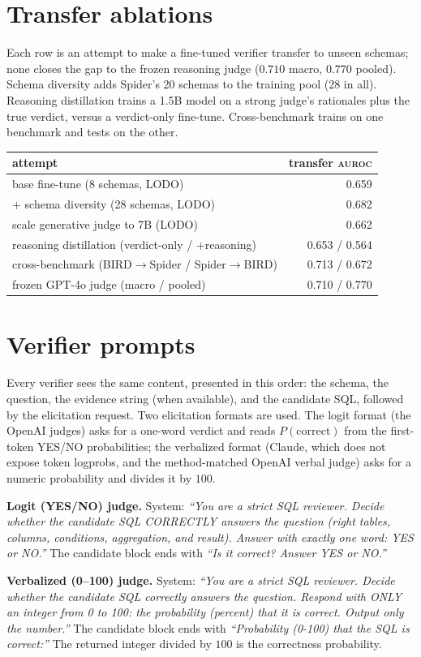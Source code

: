 \documentclass[11pt]{article}
\newcommand{\auroc}{\textsc{auroc}}
\begin{document}
\section{Transfer ablations}
\label{app:transfer}
Each row is an attempt to make a fine-tuned verifier transfer to unseen schemas; none closes the gap
to the frozen reasoning judge ($0.710$ macro, $0.770$ pooled). Schema diversity adds Spider's 20
schemas to the training pool (28 in all). Reasoning distillation trains a 1.5B model on a strong
judge's rationales plus the true verdict, versus a verdict-only fine-tune. Cross-benchmark trains on
one benchmark and tests on the other.
\begin{table}[h]\centering
\begin{tabular}{lr}
\toprule
attempt & transfer \auroc{} \\
\midrule
base fine-tune (8 schemas, LODO) & 0.659 \\
+ schema diversity (28 schemas, LODO) & 0.682 \\
scale generative judge to 7B (LODO) & 0.662 \\
reasoning distillation (verdict-only / +reasoning) & 0.653 / 0.564 \\
cross-benchmark (BIRD$\rightarrow$Spider / Spider$\rightarrow$BIRD) & 0.713 / 0.672 \\
\midrule
frozen GPT-4o judge (macro / pooled) & 0.710 / 0.770 \\
\bottomrule
\end{tabular}
\end{table}

\section{Verifier prompts}
\label{app:prompts}
Every verifier sees the same content, presented in this order: the schema, the question, the evidence
string (when available), and the candidate SQL, followed by the elicitation request. Two elicitation
formats are used. The logit format (the OpenAI judges) asks for a one-word verdict and reads
$P(\text{correct})$ from the first-token YES/NO probabilities; the verbalized format (Claude, which
does not expose token logprobs, and the method-matched OpenAI verbal judge) asks for a numeric
probability and divides it by $100$.

\noindent\textbf{Logit (YES/NO) judge.} System: \textit{``You are a strict SQL reviewer. Decide
whether the candidate SQL CORRECTLY answers the question (right tables, columns, conditions,
aggregation, and result). Answer with exactly one word: YES or NO.''} The candidate block ends with
\textit{``Is it correct? Answer YES or NO.''}

\noindent\textbf{Verbalized (0--100) judge.} System: \textit{``You are a strict SQL reviewer. Decide
whether the candidate SQL correctly answers the question. Respond with ONLY an integer from 0 to 100:
the probability (percent) that it is correct. Output only the number.''} The candidate block ends with
\textit{``Probability (0-100) that the SQL is correct:''} The returned integer divided by $100$ is the
correctness probability.



\end{document}
